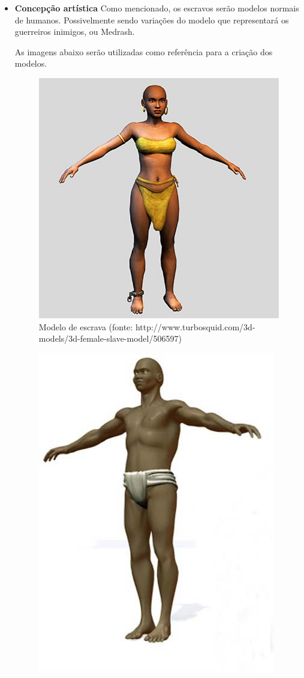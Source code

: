\begin{itemize}
\item{\bf Concepção artística}
Como mencionado, os escravos serão modelos normais de humanos. Possivelmente sendo variações do modelo que representará os guerreiros inimigos, ou Medrash.


As imagens abaixo serão utilizadas como referência para a criação dos modelos.

\begin{figure}[H]
 \centering
 \includegraphics[scale=0.5]{Imagens/mulher01.png}
 \caption{Modelo de escrava (fonte: http://www.turbosquid.com/3d-models/3d-female-slave-model/506597)}
\label{img:mulher}
\end{figure}
\newpage
\begin{figure}[H]
 \centering
 \includegraphics[scale=0.5]{Imagens/escravo01.png}

\end{figure}
\end{itemize}
